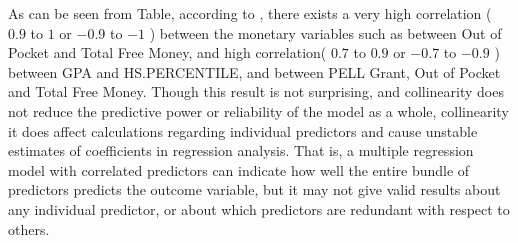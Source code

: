 \documentclass[12pt,english]{report}
\begin{document}
As can be seen from Table, according to \citep{hinkle2003applied}, there exists
a very high correlation ( $0.9$ to $1$ or $-0.9$ to $-1$ ) between the monetary
variables such as between Out of Pocket and Total Free Money, and high
correlation( $0.7$ to $0.9$ or $-0.7$ to $-0.9$ ) between GPA and
HS.PERCENTILE, and between PELL Grant, Out of Pocket and Total Free Money.
Though this result is not surprising, and collinearity does not reduce the
predictive power or reliability of the model as a whole, collinearity it does
affect calculations regarding individual predictors and cause unstable
estimates of coefficients in regression analysis. That is, a multiple
regression model with correlated predictors can indicate how well the entire
bundle of predictors predicts the outcome variable, but it may not give valid
results about any individual predictor, or about which predictors are redundant
with respect to others.
 
\end{document}
